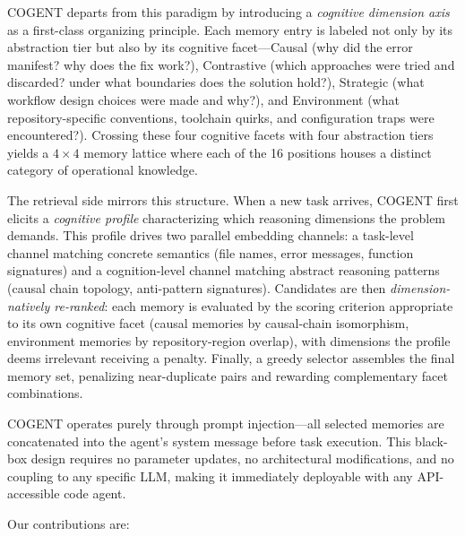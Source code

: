 \documentclass[letterpaper]{article} %
\begin{document}
\textsc{COGENT} departs from this paradigm by introducing a \emph{cognitive dimension axis} as a first-class organizing principle. Each memory entry is labeled not only by its abstraction tier but also by its cognitive facet---Causal (why did the error manifest? why does the fix work?), Contrastive (which approaches were tried and discarded? under what boundaries does the solution hold?), Strategic (what workflow design choices were made and why?), and Environment (what repository-specific conventions, toolchain quirks, and configuration traps were encountered?). Crossing these four cognitive facets with four abstraction tiers yields a $4 \times 4$ memory lattice where each of the 16 positions houses a distinct category of operational knowledge.

The retrieval side mirrors this structure. When a new task arrives, \textsc{COGENT} first elicits a \emph{cognitive profile} characterizing which reasoning dimensions the problem demands. This profile drives two parallel embedding channels: a task-level channel matching concrete semantics (file names, error messages, function signatures) and a cognition-level channel matching abstract reasoning patterns (causal chain topology, anti-pattern signatures). Candidates are then \emph{dimension-natively re-ranked}: each memory is evaluated by the scoring criterion appropriate to its own cognitive facet (causal memories by causal-chain isomorphism, environment memories by repository-region overlap), with dimensions the profile deems irrelevant receiving a penalty. Finally, a greedy selector assembles the final memory set, penalizing near-duplicate pairs and rewarding complementary facet combinations.

\textsc{COGENT} operates purely through prompt injection---all selected memories are concatenated into the agent's system message before task execution. This black-box design requires no parameter updates, no architectural modifications, and no coupling to any specific LLM, making it immediately deployable with any API-accessible code agent.

Our contributions are:
\end{document}
